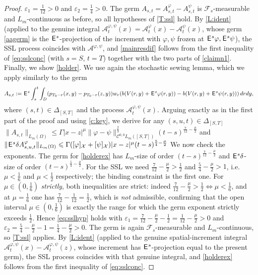 \documentclass[12pt]{article}
\theoremstyle{definition}
\DeclareMathOperator{\1}{\mathbbm{1}}%
\def\E{\hskip.15ex\mathsf{E}\hskip.10ex}
\def\phi{\varphi}
\renewcommand{\le}{\leqslant}
\newcommand{\A}{\mathcal{A}}
\newcommand{\C}{\mathcal{C}}
\newcommand{\F}{\mathcal{F}}
\newcommand{\X}{\mathcal{X}}
\begin{document}
\begin{proof}
$\varepsilon_1=\tfrac1{12}>0$ and $\varepsilon_2=\tfrac14>0$. The germ
$A_{s,t}=A^\phi_{s,t}-A^\psi_{s,t}$ is $\F_s$-measurable and $L_m$-continuous as before,
so all hypotheses of \cref{T:ssl} hold. By \cref{L:ident} (applied to the genuine
integral $\A^{\phi,\psi}_t(x)=\A^\phi_t(x)-\A^\psi_t(x)$, whose germ \eqref{aagerm} is
the $\E^s$-projection of the increment with $\phi,\psi$ frozen at $\E^s\phi,\E^s\psi$),
the SSL process coincides with $\A^{\phi,\psi}$, and \eqref{mainresdif} follows from the
first inequality of \eqref{eq:sslconc} (with $s=S$, $t=T$) together with the two parts of
\eqref{claimn1}. 
Finally, we show \eqref{holder}. We use again the stochastic sewing lemma, which we apply similarly to the germ 
\begin{equation*}
A_{s,t}:=\E^s\int_s^t \int_D( p_{T_0-r}(x,y)-p_{T_0-r}(z,y))w_r (b( V(r,y)+\E^s \phi(r,y))-b( V(r,y)+\E^s\psi(r,y)))\,dr dy, 
\end{equation*}
where $(s,t)\in\Delta_{[S,T]}$
and the process $\A^{\phi,\psi}_{t}(x)$.
Arguing exactly as in the first part of the proof and using \cref{c:key}, we derive for any $(s,u,t)\in\Delta_{[S,T]}$ 
$\|A_{s,t}\|_{L_m(\Omega)}\le  \Gamma |x-z|^\mu
\|\phi-\psi\|^{\frac23}_{\C^{0,0}L_m([S,T])}(t-s)^{\frac7{12}-\frac\mu2}$
and $
\|\E^s\delta A^\phi_{s,u,t}\|_{L_m(\Omega)}\le  \Gamma([\phi]_{\X}+[\psi]_{\X})|x-z|^\mu (t-s)^{\frac54-\frac\mu2}
$%
We now check the exponents. The germ for \eqref{holderex} has $L_m$-size of order
$(t-s)^{\frac7{12}-\frac\mu2}$ and $\E^s\delta$-size of order $(t-s)^{\frac54-\frac\mu2}$.
For the SSL we need $\frac7{12}-\frac\mu2>\frac12$ and $\frac54-\frac\mu2>1$, i.e.
$\mu<\frac16$ and $\mu<\frac12$ respectively; the binding constraint is the first one.
For $\mu\in(0,\frac16)$ \emph{strictly}, both inequalities are strict: indeed
$\frac7{12}-\frac\mu2>\frac12\iff\mu<\frac16$, and at $\mu=\frac16$ one has
$\frac7{12}-\frac1{12}=\frac12$, which is \emph{not} admissible, confirming that the
open interval $\mu\in(0,\frac16)$ is exactly the range for which the germ exponent
strictly exceeds $\frac12$. Hence \eqref{eq:sslhyp} holds with
$\varepsilon_1=\frac7{12}-\frac\mu2-\frac12=\frac1{12}-\frac\mu2>0$ and
$\varepsilon_2=\frac54-\frac\mu2-1=\frac14-\frac\mu2>0$. The germ is again
$\F_s$-measurable and $L_m$-continuous, so \cref{T:ssl} applies. By \cref{L:ident}
(applied to the genuine spatial-increment integral
$\A^{\phi,\psi}_t(x)-\A^{\phi,\psi}_t(z)$, whose increment has $\E^s$-projection equal
to the present germ), the SSL process coincides with that genuine integral, and
\eqref{holderex} follows from the first inequality of \eqref{eq:sslconc}. 
\end{proof}
\end{document}

